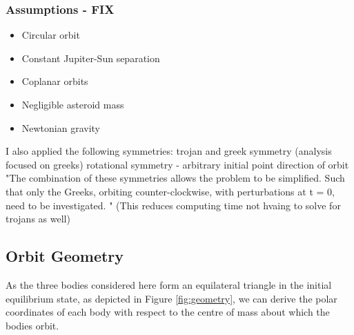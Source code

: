 \documentclass[11pt, a4paper,twocolumn]{article} %
\begin{document}
\subsubsection{Assumptions - FIX}
\begin{itemize}
	\item Circular orbit
	\item Constant Jupiter-Sun separation
	\item Coplanar orbits
	\item Negligible asteroid mass
	\item Newtonian gravity
\end{itemize}

I also applied the following symmetries:
trojan and greek symmetry (analysis focused on greeks)
rotational symmetry - arbitrary initial point 
direction of orbit
"The combination of these symmetries allows the problem to be simplified. Such that
only the Greeks, orbiting counter-clockwise, with perturbations at t = 0, need to be
investigated.
"
(This reduces computing time not hvaing to solve for trojans as well)

\subsection{Orbit Geometry}
As the three bodies considered here form an equilateral triangle in the initial equilibrium state, as depicted in Figure \ref{fig:geometry}, we can derive the polar coordinates of each body with respect to the centre of mass about which the bodies orbit.
\end{document}
